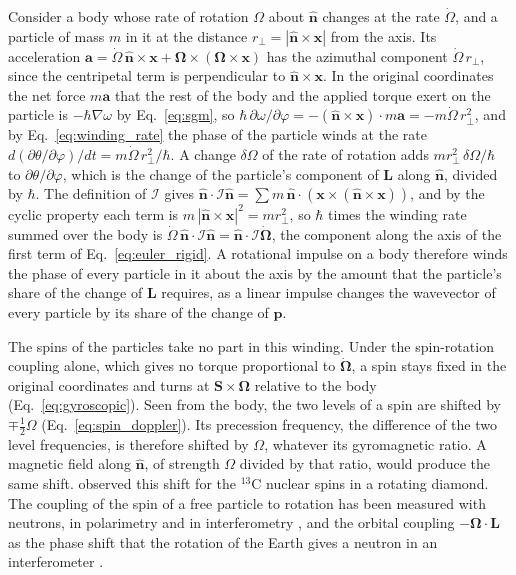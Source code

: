 \documentclass[aps,prd,onecolumn,tightenlines,nofootinbib,notitlepage,11pt,floatfix]{revtex4-2}
\theoremstyle{indentedtheorem}
\begin{document}
Consider a body whose rate of rotation $\Omega$ about $\hat{\mathbf{n}}$ changes at the rate $\dot\Omega$, and a particle of mass $m$ in it at the distance $r_\perp=|\hat{\mathbf{n}}\times\mathbf{x}|$ from the axis. Its acceleration $\mathbf{a}=\dot\Omega\,\hat{\mathbf{n}}\times\mathbf{x}+\boldsymbol{\Omega}\times(\boldsymbol{\Omega}\times\mathbf{x})$ has the azimuthal component $\dot\Omega\,r_\perp$, since the centripetal term is perpendicular to $\hat{\mathbf{n}}\times\mathbf{x}$. In the original coordinates the net force $m\mathbf{a}$ that the rest of the body and the applied torque exert on the particle is $-\hbar\nabla\omega$ by Eq.~\eqref{eq:sgm}, so $\hbar\,\partial\omega/\partial\varphi=-(\hat{\mathbf{n}}\times\mathbf{x})\cdot m\mathbf{a}=-m\dot\Omega\,r_\perp^2$, and by Eq.~\eqref{eq:winding_rate} the phase of the particle winds at the rate $d(\partial\theta/\partial\varphi)/dt=m\dot\Omega\,r_\perp^2/\hbar$. A change $\delta\Omega$ of the rate of rotation adds $m r_\perp^2\,\delta\Omega/\hbar$ to $\partial\theta/\partial\varphi$, which is the change of the particle's component of $\mathbf{L}$ along $\hat{\mathbf{n}}$, divided by $\hbar$. The definition of $\mathcal{I}$ gives $\hat{\mathbf{n}}\cdot\mathcal{I}\hat{\mathbf{n}}=\sum m\,\hat{\mathbf{n}}\cdot(\mathbf{x}\times(\hat{\mathbf{n}}\times\mathbf{x}))$, and by the cyclic property each term is $m\,|\hat{\mathbf{n}}\times\mathbf{x}|^2=m r_\perp^2$, so $\hbar$ times the winding rate summed over the body is $\dot\Omega\,\hat{\mathbf{n}}\cdot\mathcal{I}\hat{\mathbf{n}}=\hat{\mathbf{n}}\cdot\mathcal{I}\dot{\boldsymbol{\Omega}}$, the component along the axis of the first term of Eq.~\eqref{eq:euler_rigid}. A rotational impulse on a body therefore winds the phase of every particle in it about the axis by the amount that the particle's share of the change of $\mathbf{L}$ requires, as a linear impulse changes the wavevector of every particle by its share of the change of $\mathbf{p}$.

The spins of the particles take no part in this winding. Under the spin-rotation coupling alone, which gives no torque proportional to $\dot{\boldsymbol{\Omega}}$, a spin stays fixed in the original coordinates and turns at $\mathbf{S}\times\boldsymbol{\Omega}$ relative to the body (Eq.~\eqref{eq:gyroscopic}). Seen from the body, the two levels of a spin are shifted by $\mp\tfrac{1}{2}\Omega$ (Eq.~\eqref{eq:spin_doppler}). Its precession frequency, the difference of the two level frequencies, is therefore shifted by $\Omega$, whatever its gyromagnetic ratio. A magnetic field along $\hat{\mathbf{n}}$, of strength $\Omega$ divided by that ratio, would produce the same shift. \citet{Wood2017Magnetic} observed this shift for the $^{13}$C nuclear spins in a rotating diamond. The coupling of the spin of a free particle to rotation has been measured with neutrons, in polarimetry \citep{Demirel2015Measurement} and in interferometry \citep{Danner2020Spin}, and the orbital coupling $-\boldsymbol{\Omega}\cdot\mathbf{L}$ as the phase shift that the rotation of the Earth gives a neutron in an interferometer \citep{Werner1979Effect}.
\end{document}
